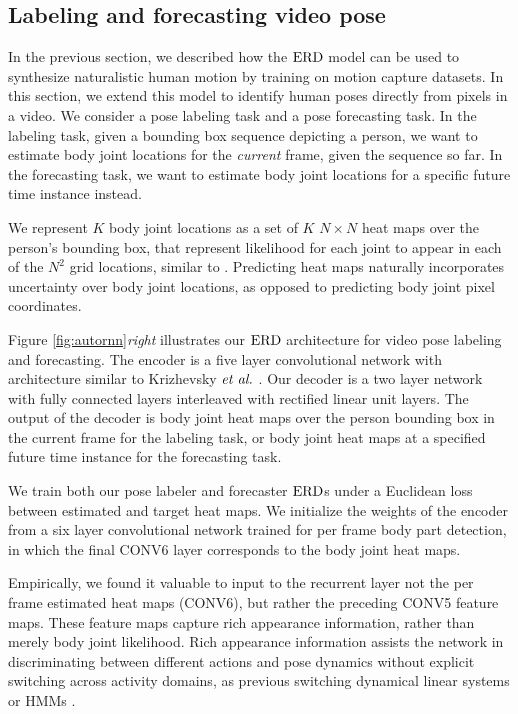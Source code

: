 \documentclass[10pt,twocolumn,letterpaper]{article}
\begin{document}
\subsection{Labeling and forecasting video pose}
In the previous section, we described how the $\text{ERD}$ model can be used to synthesize naturalistic human motion by training on  motion capture datasets. 
In this section, we extend this model to identify human poses directly from pixels in a video. We consider a pose labeling task and a pose forecasting task. In the labeling task, given a bounding box sequence depicting a person, we want to estimate body joint locations for the \textit{current} frame, given the sequence so far.
In the forecasting task, we want to estimate body joint locations for a specific future time instance instead.   








We represent $K$ body joint locations as a set of $K$ $N \times N$ heat maps over the person's bounding box, that represent likelihood for each joint to appear in each of the $N^2$ grid locations, similar to \cite{vpsKpsTulsianiM14}.  Predicting heat maps naturally incorporates uncertainty over  body joint locations, as opposed to predicting body joint pixel coordinates. 
 






Figure \ref{fig:autornn}\textit{right} illustrates our $\text{ERD}$ architecture for video pose labeling and forecasting.  The encoder is a five layer convolutional network with architecture similar to Krizhevsky $\text{\textit{et al.}}$ \cite{NIPS2012_0534}. Our decoder is a two layer network with fully connected layers interleaved with  rectified linear unit layers.  
The output of the decoder  is    body joint heat maps over the person bounding box in the current frame for the labeling task, or body joint heat maps at a specified future time instance for the forecasting  task. 





We train both our pose labeler and forecaster $\text{ERD}$s under a Euclidean loss between estimated and target heat maps. 
We initialize the weights of the encoder from a   six layer convolutional network trained for per frame body part detection, in which the final CONV6 layer corresponds to the body joint heat maps.  

Empirically, we found it valuable to input to the recurrent layer not the per frame estimated heat maps (CONV6), but rather the preceding CONV5  feature maps.   These feature maps capture rich appearance information, rather than merely  body joint likelihood.  
Rich appearance information  assists the network in discriminating between different actions and pose dynamics without  explicit switching across activity domains, as previous switching dynamical linear systems  or HMMs \cite{prm-lslmh-00}.
\end{document}
